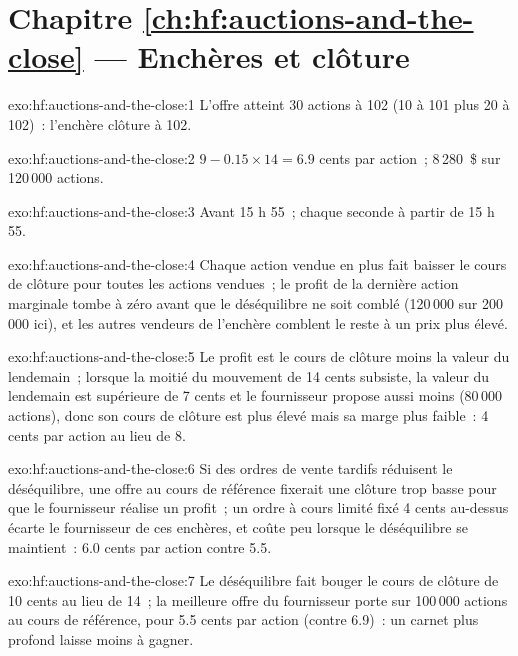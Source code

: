 \section*{Chapitre \ref{ch:hf:auctions-and-the-close} --- Enchères et clôture}

\begin{solution}{exo:hf:auctions-and-the-close:1}
L'offre atteint 30 actions à 102 (10 à 101 plus 20 à 102)~: l'enchère clôture à 102.
\end{solution}

\begin{solution}{exo:hf:auctions-and-the-close:2}
$9-0.15\times14=6.9$ cents par action~; 8\,280~\$ sur 120\,000 actions.
\end{solution}

\begin{solution}{exo:hf:auctions-and-the-close:3}
Avant 15 h 55~; chaque seconde à partir de 15 h 55.
\end{solution}

\begin{solution}{exo:hf:auctions-and-the-close:4}
Chaque action vendue en plus fait baisser le cours de clôture pour toutes les actions vendues~; le profit de la dernière action marginale tombe à zéro avant que le déséquilibre ne soit comblé
(120\,000 sur 200\,000 ici), et les autres vendeurs de l'enchère comblent le reste à un prix plus élevé.
\end{solution}

\begin{solution}{exo:hf:auctions-and-the-close:5}
Le profit est le cours de clôture moins la valeur du lendemain~; lorsque la moitié du mouvement de 14 cents subsiste, la valeur du lendemain est supérieure de 7 cents et le fournisseur propose aussi
moins (80\,000 actions), donc son cours de clôture est plus élevé mais sa marge plus faible~: 4 cents par action au lieu de 8.
\end{solution}

\begin{solution}{exo:hf:auctions-and-the-close:6}
Si des ordres de vente tardifs réduisent le déséquilibre, une offre au cours de référence fixerait une clôture trop basse pour que le fournisseur réalise un profit~; un ordre à cours limité fixé 4 cents au-dessus
écarte le fournisseur de ces enchères, et coûte peu lorsque le déséquilibre se maintient~: 6.0 cents par action contre 5.5.
\end{solution}

\begin{solution}{exo:hf:auctions-and-the-close:7}
Le déséquilibre fait bouger le cours de clôture de 10 cents au lieu de 14~; la meilleure offre du fournisseur porte sur 100\,000 actions au cours de référence, pour 5.5 cents par action
(contre 6.9)~: un carnet plus profond laisse moins à gagner.
\end{solution}

